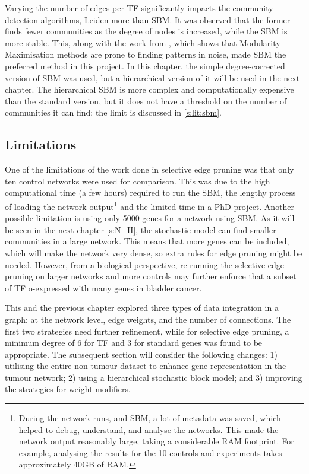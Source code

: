 Varying the number of edges per TF significantly impacts the community detection algorithms, Leiden more than SBM. It was observed that the former finds fewer communities as the degree of nodes is increased, while the SBM is more stable. This, along with the work from \citet{Peixoto2023-se, Peixoto2023-rt}, which shows that Modularity Maximisation methods are prone to finding patterns in noise, made SBM the preferred method in this project. In this chapter, the simple degree-corrected version of SBM was used, but a hierarchical version of it will be used in the next chapter. The hierarchical SBM is more complex and computationally expensive than the standard version, but it does not have a threshold on the number of communities it can find; the limit is discussed in \cref{s:lit:sbm}.


\subsection* {Limitations}

One of the limitations of the work done in selective edge pruning was that only ten control networks were used for comparison. This was due to the high computational time (a few hours) required to run the SBM, the lengthy process of loading the network output\footnote{During the network runs, and SBM, a lot of metadata was saved, which helped to debug, understand, and analyse the networks. This made the network output reasonably large, taking a considerable RAM footprint. For example, analysing the results for the 10 controls and experiments takes approximately 40GB of RAM.} and the limited time in a PhD project. Another possible limitation is using only 5000 genes for a network using SBM. As it will be seen in the next chapter \cref{s:N_II}, the stochastic model can find smaller communities in a large network. This means that more genes can be included, which will make the network very dense, so extra rules for edge pruning might be needed. However, from a biological perspective, re-running the selective edge pruning on larger networks and more controls may further enforce that a subset of TF o-expressed with many genes in bladder cancer.


This and the previous chapter explored three types of data integration in a graph: at the network level, edge weights, and the number of connections. The first two strategies need further refinement, while for selective edge pruning, a minimum degree of 6 for TF and 3 for standard genes was found to be appropriate. The subsequent section will consider the following changes: 1) utilising the entire non-tumour dataset to enhance gene representation in the tumour network; 2) using a hierarchical stochastic block model; and 3) improving the strategies for weight modifiers.


